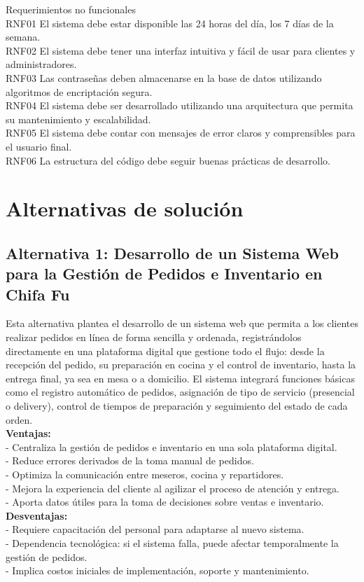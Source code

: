 \documentclass{article}
\begin{document}
\begin{doublespace}
    \noindent Requerimientos no funcionales\\
        RNF01	El sistema debe estar disponible las 24 horas del día, los 7 días de la semana.\\
        RNF02	El sistema debe tener una interfaz intuitiva y fácil de usar para clientes y administradores.\\
        RNF03	Las contraseñas deben almacenarse en la base de datos utilizando algoritmos de encriptación segura.\\
        RNF04	El sistema debe ser desarrollado utilizando una arquitectura que permita su mantenimiento y escalabilidad.\\
        RNF05	El sistema debe contar con mensajes de error claros y comprensibles para el usuario final.\\
        RNF06	La estructura del código debe seguir buenas prácticas de desarrollo.\\

    \section{Alternativas de solución}
    \subsection{Alternativa 1: Desarrollo de un Sistema Web para la Gestión de Pedidos e Inventario en Chifa Fu}

    \noindent Esta alternativa plantea el desarrollo de un sistema web que permita a los clientes realizar pedidos en línea de forma sencilla y ordenada, registrándolos directamente en una plataforma digital que gestione todo el flujo: desde la recepción del pedido, su preparación en cocina y el control de inventario, hasta la entrega final, ya sea en mesa o a domicilio. El sistema integrará funciones básicas como el registro automático de pedidos, asignación de tipo de servicio (presencial o delivery), control de tiempos de preparación y seguimiento del estado de cada orden.\\
    \textbf{Ventajas:}\\
    - Centraliza la gestión de pedidos e inventario en una sola plataforma digital.\\
    - Reduce errores derivados de la toma manual de pedidos.\\
    - Optimiza la comunicación entre meseros, cocina y repartidores.\\
    - Mejora la experiencia del cliente al agilizar el proceso de atención y entrega.\\
    - Aporta datos útiles para la toma de decisiones sobre ventas e inventario.\\
    \textbf{Desventajas:}\\
    - Requiere capacitación del personal para adaptarse al nuevo sistema.\\
    - Dependencia tecnológica: si el sistema falla, puede afectar temporalmente la gestión de pedidos.\\
    - Implica costos iniciales de implementación, soporte y mantenimiento.\\


\end{doublespace}
\end{document}

